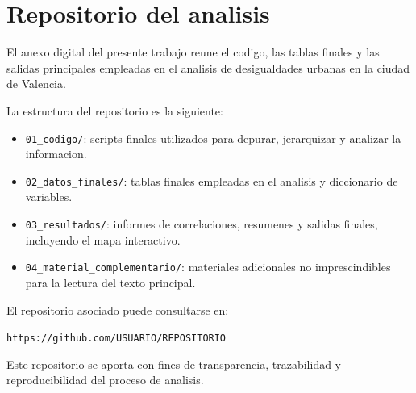 \section{Repositorio del analisis}

El anexo digital del presente trabajo reune el codigo, las tablas finales y las salidas principales empleadas en el analisis de desigualdades urbanas en la ciudad de Valencia.

La estructura del repositorio es la siguiente:

\begin{itemize}
    \item \texttt{01\_codigo/}: scripts finales utilizados para depurar, jerarquizar y analizar la informacion.
    \item \texttt{02\_datos\_finales/}: tablas finales empleadas en el analisis y diccionario de variables.
    \item \texttt{03\_resultados/}: informes de correlaciones, resumenes y salidas finales, incluyendo el mapa interactivo.
    \item \texttt{04\_material\_complementario/}: materiales adicionales no imprescindibles para la lectura del texto principal.
\end{itemize}

El repositorio asociado puede consultarse en:

\begin{center}
\texttt{https://github.com/USUARIO/REPOSITORIO}
\end{center}

Este repositorio se aporta con fines de transparencia, trazabilidad y reproducibilidad del proceso de analisis.
